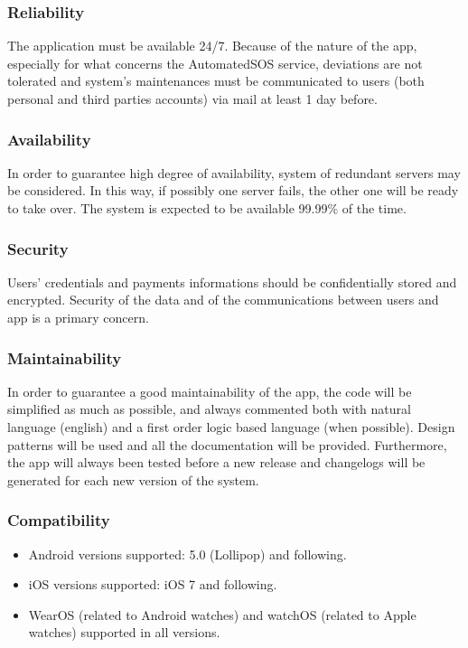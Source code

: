 \subsubsection{Reliability}
The application must be available 24/7. Because of the nature of the app, especially for what concerns the AutomatedSOS service, deviations are not tolerated and system's maintenances must be communicated to users (both personal and third parties accounts) via mail at least 1 day before.

\subsubsection{Availability}
In order to guarantee high degree of availability, system of redundant servers may be considered. In this way, if possibly one server fails, the other one will be ready to take over. The system is expected to be
available 99.99\% of the time.

\subsubsection{Security}
Users' credentials and payments informations should be confidentially stored and encrypted. Security of the data and of the communications between users and app is a primary concern.

\subsubsection{Maintainability}
In order to guarantee a good maintainability of the app, the code will be simplified as much as possible, and always commented both with natural language (english) and a first order logic based language (when possible). Design patterns will be used and all the documentation will be provided. Furthermore, the app will always been tested before a new release and changelogs will be generated for each new version of the system.

\subsubsection{Compatibility}
\begin{itemize}
\item Android versions supported: 5.0 (Lollipop) and following.
\item iOS versions supported: iOS 7 and following.
\item WearOS (related to Android watches) and watchOS (related to Apple watches) supported in all versions.
\end{itemize}

%